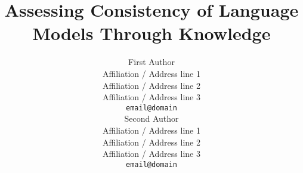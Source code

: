 \documentclass[11pt]{article}
\title{Assessing Consistency of Language Models Through Knowledge}
\author{First Author \\
  Affiliation / Address line 1 \\
  Affiliation / Address line 2 \\
  Affiliation / Address line 3 \\
  \texttt{email@domain} \\\And
  Second Author \\
  Affiliation / Address line 1 \\
  Affiliation / Address line 2 \\
  Affiliation / Address line 3 \\
  \texttt{email@domain} \\}
\begin{document}
\maketitle
\begin{abstract}

\end{abstract}




















% 







\appendix




\end{document}
